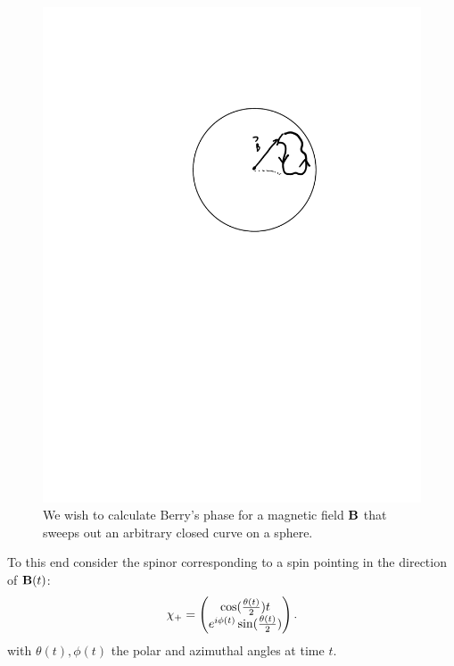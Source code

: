 \begin{figure}[htbp]
    \centering
    \includegraphics[scale=0.7]{Images/fig-sphereclosedcurve.pdf}

    \caption{We wish to calculate Berry's phase for a magnetic field $\mathbf{B}$ that sweeps out an arbitrary closed curve on a sphere.}
    \label{fig-sphereclosedcurve}
\end{figure}

To this end consider the spinor corresponding to a spin pointing in the direction of $\mathbf{B}(t)$:
\begin{equation}
    \chi_+ = \m{\cos(\frac{\theta(t)}{2}){t} \\ e^{i\phi(t)}\sin(\frac{\theta(t)}{2})}.
\end{equation}
with $\theta(t), \phi(t)$ the polar and azimuthal angles at time $t$. 

